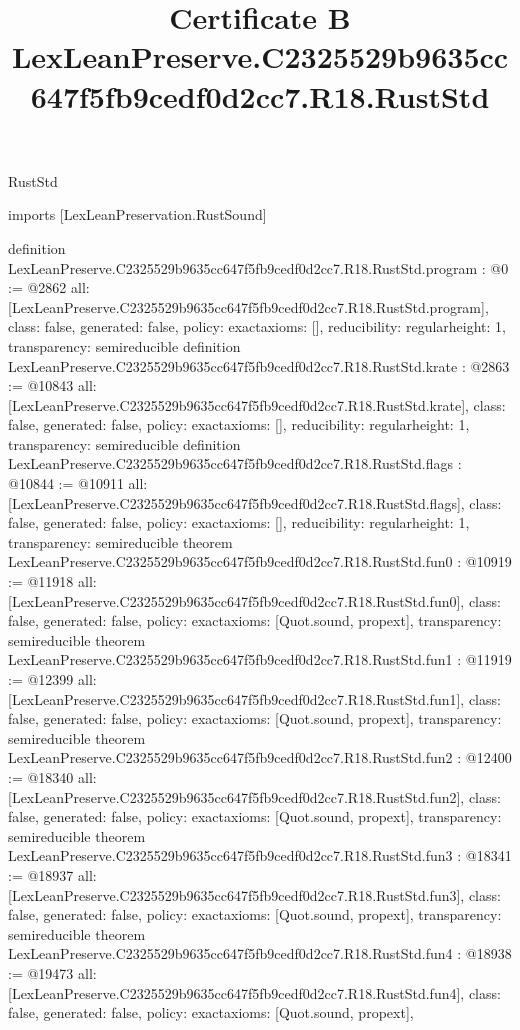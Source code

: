 \begin{lexlean}{RustStd}
\title{Certificate B LexLeanPreserve.C2325529b9635cc647f5fb9cedf0d2cc7.R18.RustStd}
\begin{coremodule}
imports [LexLeanPreservation.RustSound]

definition LexLeanPreserve.C2325529b9635cc647f5fb9cedf0d2cc7.R18.RustStd.program : @0 := @2862 {
  all: [LexLeanPreserve.C2325529b9635cc647f5fb9cedf0d2cc7.R18.RustStd.program],
  class: false,
  generated: false,
  policy: exact{axioms: []},
  reducibility: regular{height: 1},
  transparency: semireducible
}
definition LexLeanPreserve.C2325529b9635cc647f5fb9cedf0d2cc7.R18.RustStd.krate : @2863 := @10843 {
  all: [LexLeanPreserve.C2325529b9635cc647f5fb9cedf0d2cc7.R18.RustStd.krate],
  class: false,
  generated: false,
  policy: exact{axioms: []},
  reducibility: regular{height: 1},
  transparency: semireducible
}
definition LexLeanPreserve.C2325529b9635cc647f5fb9cedf0d2cc7.R18.RustStd.flags : @10844 := @10911 {
  all: [LexLeanPreserve.C2325529b9635cc647f5fb9cedf0d2cc7.R18.RustStd.flags],
  class: false,
  generated: false,
  policy: exact{axioms: []},
  reducibility: regular{height: 1},
  transparency: semireducible
}
theorem LexLeanPreserve.C2325529b9635cc647f5fb9cedf0d2cc7.R18.RustStd.fun0 : @10919 := @11918 {
  all: [LexLeanPreserve.C2325529b9635cc647f5fb9cedf0d2cc7.R18.RustStd.fun0],
  class: false,
  generated: false,
  policy: exact{axioms: [Quot.sound, propext]},
  transparency: semireducible
}
theorem LexLeanPreserve.C2325529b9635cc647f5fb9cedf0d2cc7.R18.RustStd.fun1 : @11919 := @12399 {
  all: [LexLeanPreserve.C2325529b9635cc647f5fb9cedf0d2cc7.R18.RustStd.fun1],
  class: false,
  generated: false,
  policy: exact{axioms: [Quot.sound, propext]},
  transparency: semireducible
}
theorem LexLeanPreserve.C2325529b9635cc647f5fb9cedf0d2cc7.R18.RustStd.fun2 : @12400 := @18340 {
  all: [LexLeanPreserve.C2325529b9635cc647f5fb9cedf0d2cc7.R18.RustStd.fun2],
  class: false,
  generated: false,
  policy: exact{axioms: [Quot.sound, propext]},
  transparency: semireducible
}
theorem LexLeanPreserve.C2325529b9635cc647f5fb9cedf0d2cc7.R18.RustStd.fun3 : @18341 := @18937 {
  all: [LexLeanPreserve.C2325529b9635cc647f5fb9cedf0d2cc7.R18.RustStd.fun3],
  class: false,
  generated: false,
  policy: exact{axioms: [Quot.sound, propext]},
  transparency: semireducible
}
theorem LexLeanPreserve.C2325529b9635cc647f5fb9cedf0d2cc7.R18.RustStd.fun4 : @18938 := @19473 {
  all: [LexLeanPreserve.C2325529b9635cc647f5fb9cedf0d2cc7.R18.RustStd.fun4],
  class: false,
  generated: false,
  policy: exact{axioms: [Quot.sound, propext]},
}
\end{coremodule}
\end{lexlean}
